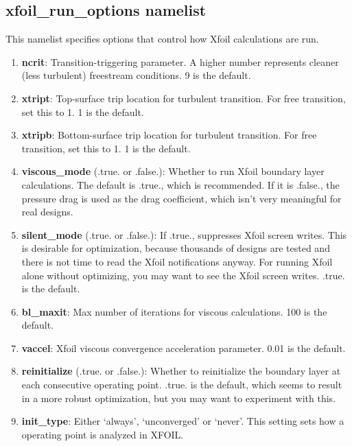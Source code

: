 \documentclass[11pt]{article}
\begin{document}
\subsection{xfoil\_run\_options namelist}

This namelist specifies options that control how Xfoil calculations are run.

\begin{enumerate}
\item{\textbf{ncrit}: Transition-triggering parameter.  A higher number represents cleaner
(less turbulent) freestream conditions.  9 is the default.}

\item{\textbf{xtript}: Top-surface trip location for turbulent transition.  For free
transition, set this to 1.  1 is the default.}

\item{\textbf{xtripb}: Bottom-surface trip location for turbulent transition.  For free
transition, set this to 1.  1 is the default.}

\item{\textbf{viscous\_mode} (.true. or .false.): Whether to run Xfoil boundary layer
calculations.  The default is .true., which is recommended.  If it is .false., the pressure
drag is used as the drag coefficient, which isn't very meaningful for real designs.}

\item{\textbf{silent\_mode} (.true. or .false.): If .true., suppresses Xfoil screen writes.
This is desirable for optimization, because thousands of designs are tested and there is
not time to read the Xfoil notifications anyway.  For running Xfoil alone without
optimizing, you may want to see the Xfoil screen writes.  .true. is the default.}

\item{\textbf{bl\_maxit}: Max number of iterations for viscous calculations.  100 is the
default.}

\item{\textbf{vaccel}: Xfoil viscous convergence acceleration parameter.  0.01 is the
default.}

\item{\textbf{reinitialize} (.true. or .false.): Whether to reinitialize the boundary
	layer at each consecutive operating point.  .true. is the default, which seems to result 
	in a more robust optimization, but you may want to experiment with this.}


\item{\textbf{init\_type}: Either `always', `unconverged' or `never'.
	This setting sets how a operating point is analyzed in XFOIL.
	
}
\end{enumerate}
\end{document}

